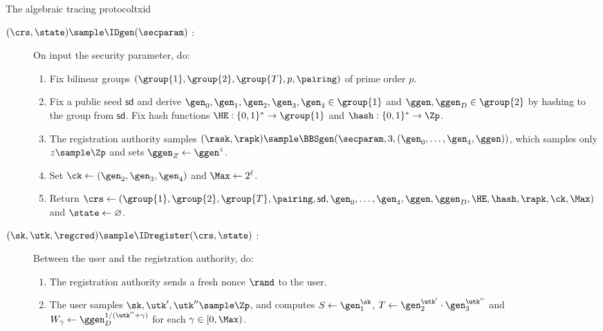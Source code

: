 \begin{protocolbox}{The algebraic tracing protocol}{txid}

  \begin{description}

    \item[$(\crs,\state) \sample \IDgen(\secparam)$ :] On input the security
parameter, do:

      \begin{enumerate}

	\item Fix bilinear groups $(\group{1},\group{2},\group{T},p,\pairing)$
of prime order $p$.

	\item Fix a public seed $\mathsf{sd}$ and derive
$\gen_0,\gen_1,\gen_2,\gen_3,\gen_4 \in \group{1}$ and $\ggen,\ggen_D \in
\group{2}$ by hashing to the group from $\mathsf{sd}$. Fix hash functions $\HE
: \{0,1\}^* \to \group{1}$ and $\hash : \{0,1\}^* \to \Zp$.

	\item The registration authority samples $(\rask,\rapk) \sample
\BBSgen(\secparam,3,(\gen_0,\ldots,\gen_4,\ggen))$, which samples only $z
\sample \Zp$ and sets $\ggen_Z \leftarrow \ggen^z$.

	\item Set $\ck \leftarrow (\gen_2,\gen_3,\gen_4)$ and $\Max \leftarrow
2^{\ell}$.

	\item Return $\crs \leftarrow (\group{1},\group{2},\group{T},\pairing,
\mathsf{sd}, \allowbreak \gen_0,\ldots,\gen_4,\ggen,\ggen_D, \allowbreak
\HE,\hash, \rapk,\ck,\Max)$ and
$\state \leftarrow \varnothing$.

      \end{enumerate}

    \item[$(\sk,\utk,\regcred) \sample \IDregister(\crs,\state)$ :] Between the
user and the registration authority, do:

      \begin{enumerate}

	\item The registration authority sends a fresh nonce $\rand$ to the
user.

	\item The user samples $\sk,\utk',\utk'' \sample \Zp$, and computes $S
\leftarrow \gen_1^{\sk}$, $T \leftarrow \gen_2^{\utk'}\cdot\gen_3^{\utk''}$ and
$W_\gamma \leftarrow \ggen_D^{1/(\utk''+\gamma)}$ for each $\gamma \in
[0,\Max)$.


\end{enumerate}
\end{description}
\end{protocolbox}
